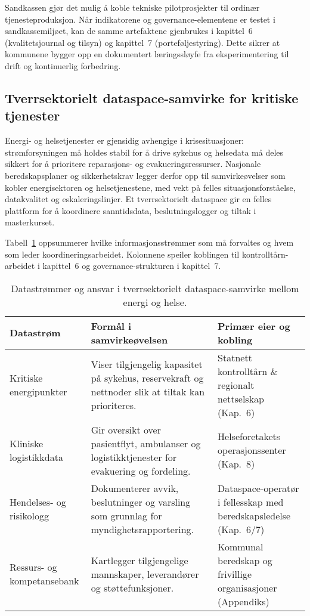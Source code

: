 Sandkassen gjør det mulig å koble tekniske pilotprosjekter til ordinær tjenesteproduksjon. Når indikatorene og governance-elementene er testet i sandkassemiljøet, kan de samme artefaktene gjenbrukes i kapittel~6 (kvalitetsjournal og tilsyn) og kapittel~7 (porteføljestyring). Dette sikrer at kommunene bygger opp en dokumentert læringssløyfe fra eksperimentering til drift og kontinuerlig forbedring.


\subsection{Tverrsektorielt dataspace-samvirke for kritiske tjenester}
Energi- og helsetjenester er gjensidig avhengige i krisesituasjoner: strømforsyningen må holdes stabil for å drive sykehus og
helsedata må deles sikkert for å prioritere reparasjons- og evakueringsressurser. Nasjonale beredskapsplaner og sikkerhetskrav
legger derfor opp til samvirkeøvelser som kobler energisektoren og helsetjenestene, med vekt på felles situasjonsforståelse,
datakvalitet og eskaleringslinjer.\citep{dsb2023totalberedskap,nsm2023grunnprinsipper,nhn2024dataspace,statnett2024kontrolltarn,helsedir2023beredskap}
Et tverrsektorielt dataspace gir en felles plattform for å koordinere sanntidsdata, beslutningslogger og tiltak i masterkurset.

Tabell~\ref{tab:kap03-tversektor-samvirke} oppsummerer hvilke informasjonsstrømmer som må forvaltes og hvem som leder
koordineringsarbeidet. Kolonnene speiler koblingen til kontrolltårn-arbeidet i kapittel~6 og governance-strukturen i
kapittel~7.

\begin{table}[ht]
    \centering
    \caption{Datastrømmer og ansvar i tverrsektorielt dataspace-samvirke mellom energi og helse.}
    \label{tab:kap03-tversektor-samvirke}
    \begin{tabular}{p{}p{}p{}}
        \toprule
        \textbf{Datastrøm} & \textbf{Formål i samvirkeøvelsen} & \textbf{Primær eier og kobling} \\
        \midrule
        Kritiske energipunkter & Viser tilgjengelig kapasitet på sykehus, reservekraft og nettnoder slik at tiltak kan prioriteres. & Statnett kontrolltårn \& regionalt nettselskap (Kap.~6) \\
        Kliniske logistikkdata & Gir oversikt over pasientflyt, ambulanser og logistikktjenester for evakuering og fordeling. & Helseforetakets operasjonssenter (Kap.~8) \\
        Hendelses- og risikologg & Dokumenterer avvik, beslutninger og varsling som grunnlag for myndighetsrapportering. & Dataspace-operatør i fellesskap med beredskapsledelse (Kap.~6/7) \\
        Ressurs- og kompetansebank & Kartlegger tilgjengelige mannskaper, leverandører og støttefunksjoner. & Kommunal beredskap og frivillige organisasjoner (Appendiks) \\
        \bottomrule
    \end{tabular}
\end{table}

